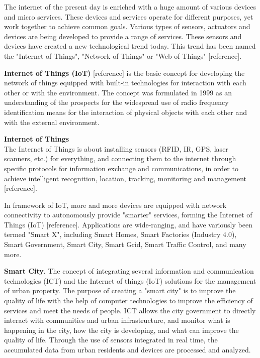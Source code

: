 The internet of the present day is enriched with a huge amount of various devices and micro services. These devices and services operate for different purposes, yet work together to achieve common goals. Various types of sensors, actuators and devices are being developed to provide a range of services. These sensors and devices have created a new technological trend today. This trend has been named the "Internet of Things", "Network of Things" or "Web of Things" [reference]. 

\textbf{Internet of Things (IoT)} [reference] is the basic concept for developing the network of things equipped with built-in technologies for interaction with each other or with the environment. The concept was formulated in 1999 as an understanding of the prospects for the widespread use of radio frequency identification means for the interaction of physical objects with each other and with the external environment. 
\begin{definition}
\textbf{Internet of Things}\label{definition:internetOfThings}\\
The Internet of Things is about installing sensors (RFID, IR, GPS, laser scanners, etc.) for everything, and connecting them to the internet through specific protocols for information exchange and communications, in order to achieve intelligent recognition, location, tracking, monitoring and management [reference].
\end{definition}

In framework of IoT, more and more devices are equipped with network connectivity to autonomously provide "smarter" services, forming the Internet of Things (IoT) [reference]. Applications are wide-ranging, and have variously been termed "Smart X", including Smart Homes, Smart Factories (Industry 4.0), Smart Government, Smart City, Smart Grid, Smart Traffic Control, and many more.

\textbf{Smart City}. The concept of integrating several information and communication technologies (ICT) and the Internet of things (IoT) solutions for the management of urban property. The purpose of creating a "smart city" is to improve the quality of life with the help of computer technologies to improve the efficiency of services and meet the needs of people. ICT allows the city government to directly interact with communities and urban infrastructure, and monitor what is happening in the city, how the city is developing, and what can improve the quality of life. Through the use of sensors integrated in real time, the accumulated data from urban residents and devices are processed and analyzed. 

